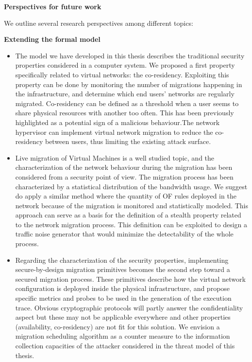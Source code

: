 \textbf{Perspectives for future work\\}

We outline several research perspectives among different topics: 

\textbf{Extending the formal model}
\begin{itemize}
    \item 
    The model we have developed in this thesis describes the traditional security properties considered in a computer system. We proposed a first property specifically related to virtual networks: the co-residency. Exploiting this property can be done by monitoring the number of migrations happening in the infrastructure, and determine which end users' networks are regularly migrated. Co-residency can be defined as a threshold when a user seems to share physical resources with another too often. This has been previously highlighted as a potential sign of a malicious behaviour.The network hypervisor can implement virtual network migration to reduce the co-residency between users, thus limiting the existing attack surface.

    \item 
    Live migration of Virtual Machines is a well studied topic, and the characterization of the network behaviour during the migration has been considered from a security point of view.
    The migration process has been characterized by a statistical distribution of the bandwidth usage.
    We suggest do apply a similar method where the quantity of OF rules deployed in the network because of the migration is monitored and statistically modeled. This approach can serve as a basis for the definition of a stealth property related to the network migration process. This definition can be exploited to design a traffic noise generator that would minimize the detectability of the whole process.


    \item 
    Regarding the characterization of the security properties, implementing secure-by-design migration primitives becomes the second step toward a secured migration process. These primitives describe how the virtual network configuration is deployed inside the physical infrastructure, and propose specific metrics and probes to be used in the generation of the execution trace. Obvious cryptographic protocols will partly answer the confidentiality aspect but these may not be applicable everywhere and other properties (\eg availability, co-residency) are not fit for this solution. We envision a migration scheduling algorithm as a counter measure to the information collection capacities of the attacker considered in the threat model of this thesis.
    
\end{itemize}
